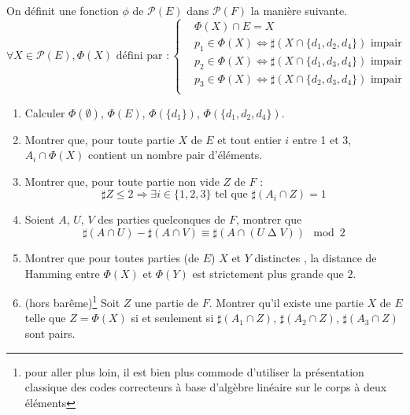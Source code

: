 On définit une fonction $\phi$ de $\mathcal P(E)$ dans $\mathcal P(F)$ la manière suivante.
\begin{displaymath}
 \forall X\in \mathcal P(E), \Phi(X)\text{ défini par }:
\left\lbrace 
\begin{aligned}
 &\Phi(X) \cap E = X \\
&p_1\in \Phi(X) \Leftrightarrow \sharp\left(X\cap\{d_1,d_2,d_4\} \right) \text{ impair}\\
&p_2\in \Phi(X) \Leftrightarrow \sharp\left(X\cap\{d_1,d_3,d_4\} \right) \text{ impair}\\
&p_3\in \Phi(X) \Leftrightarrow \sharp\left(X\cap\{d_2,d_3,d_4\} \right) \text{ impair}\\ 
\end{aligned}
\right. 
\end{displaymath}
\begin{enumerate}
 \item Calculer $\Phi(\emptyset)$, $\Phi(E)$, $\Phi(\{d_1\})$, $\Phi(\{d_1,d_2,d_4\})$.
 \item Montrer que, pour toute partie $X$ de $E$ et tout entier $i$ entre 1 et 3, $A_i\cap \Phi(X)$ contient un nombre pair d'éléments.
\item Montrer que, pour toute partie non vide $Z$ de $F$ :
\begin{displaymath}
 \sharp Z \leq 2 \Rightarrow \exists i \in \{1,2,3\} \text{ tel que } \sharp\left(  A_i\cap Z\right)  =1
\end{displaymath}
\item Soient $A$, $U$, $V$ des parties quelconques de $F$, montrer que
\begin{displaymath}
 \sharp(A\cap U) - \sharp(A\cap V) \equiv \sharp\left(A\cap (U\mathop{\Delta} V) \right) \mod 2 
\end{displaymath}
\item Montrer que pour toutes parties (de $E$) $X$ et $Y$ distinctes , la distance de Hamming entre $\Phi(X)$ et $\Phi(Y)$ est strictement plus grande que $2$.
\item (hors barême)\footnote{pour aller plus loin, il est bien plus commode d'utiliser la présentation classique des codes correcteurs à base d'algèbre linéaire sur le corps à deux éléments} Soit $Z$ une partie de $F$. Montrer qu'il existe une partie $X$ de $E$ telle que $Z=\Phi(X)$ si et seulement si $\sharp(A_1\cap Z)$, $\sharp(A_2\cap Z)$, $\sharp(A_3\cap Z)$ sont pairs.
\end{enumerate}
